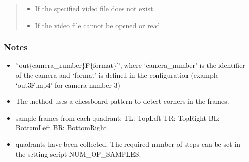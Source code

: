 \documentclass[letterpaper,10pt,english]{sphinxmanual}
\begin{document}
\begin{fulllineitems}
\begin{fulllineitems}
\begin{quote}
\begin{description}
\begin{itemize}
\end{itemize}

\begin{itemize}
\item {} 
\sphinxAtStartPar
{} \textendash{} If the specified video file does not exist.

\item {} 
\sphinxAtStartPar
{} \textendash{} If the video file cannot be opened or read.

\end{itemize}

\end{description}\end{quote}
\subsubsection*{Notes}
\begin{itemize}
\item {} \begin{description}
\sphinxAtStartPar
“out\{camera\_number\}F\{format\}”,
where ‘camera\_number’ is the identifier
of the camera and ‘format’ is defined in the configuration
(example ‘out3F.mp4’ for camera number 3)

\end{description}

\item {} 
\sphinxAtStartPar
The method uses a chessboard pattern to detect corners in the frames.

\item {} \begin{description}
\sphinxAtStartPar
sample frames from each quadrant:
\sphinxhyphen{} TL: Top\sphinxhyphen{}Left
\sphinxhyphen{} TR: Top\sphinxhyphen{}Right
\sphinxhyphen{} BL: Bottom\sphinxhyphen{}Left
\sphinxhyphen{} BR: Bottom\sphinxhyphen{}Right

\end{description}

\item {} \begin{description}
\sphinxAtStartPar
quadrants have been collected. The required number of steps can be
set in the setting script NUM\_OF\_SAMPLES.


\end{description}
\end{itemize}
\end{fulllineitems}
\end{fulllineitems}
\end{document}
